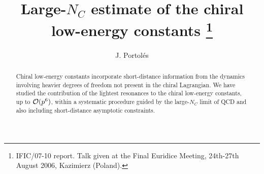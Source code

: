 \documentclass{appolb}
\begin{document}
\title{Large-$N_C$ estimate of the chiral low-energy constants \footnote{IFIC/07-10 report. Talk given
at the Final Euridice Meeting, 24th-27th August 2006, Kazimierz (Poland).}
}
\author{J. Portol\'es
\address{Instituto de F\'{\i}sica Corpuscular, IFIC, CSIC-Universitat de Val\`encia, \\ Apt. Correus 22085,
E-46071 Val\`encia, Spain}
}
\maketitle
\begin{abstract}
Chiral low-energy constants incorporate short-distance information from the dynamics involving heavier degrees of
freedom not present in the chiral Lagrangian. We have studied the contribution of the lightest resonances
to the chiral low-energy constants, up to ${\cal O}(p^6)$, within a systematic procedure guided by the 
large-$N_C$ limit of QCD and also including short-distance asymptotic constraints. 
\end{abstract}
  
\end{document}
